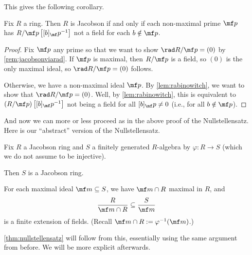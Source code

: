 This gives the following corollary.
\begin{corollary}[Rabinowitch] \label{cor:betterjacobson}
	Fix $R$ a ring. Then $R$ is Jacobson if and only if each non-maximal prime $\mf p$ has $R/\mf p\left[[b]_\mf p^{-1}\right]$ not a field for each $b\notin\mf p$.
\end{corollary}
\begin{proof}
	Fix $\mf p$ any prime so that we want to show $\rad R/\mf p=(0)$ by \autoref{rem:jacobsonviarad}. If $\mf p$ is maximal, then $R/\mf p$ is a field, so $(0)$ is the only maximal ideal, so $\rad R/\mf p=(0)$ follows.

	Otherwise, we have a non-maximal ideal $\mf p$. By \autoref{lem:rabinowitch}, we want to show that $\rad R/\mf p=(0)$. Well, by \autoref{lem:rabinowitch}, this is equivalent to $(R/\mf p)\left[[b]_\mf p^{-1}\right]$ not being a field for all $[b]_\mf p\ne0$ (i.e., for all $b\notin\mf p$).
\end{proof}
And now we can more or less proceed as in the above proof of the Nullstellensatz. Here is our ``abstract'' version of the Nullstellensatz.
\begin{theorem} \label{thm:gennullstellensatz}
	Fix $R$ a Jacobson ring and $S$ a finitely generated $R$-algebra by $\varphi:R\to S$ (which we do not assume to be injective).
	\begin{listalph}
		\item Then $S$ is a Jacobson ring.
		\item For each maximal ideal $\mf m\subseteq S$, we have $\mf m\cap R$ maximal in $R$, and
		\[\frac R{\mf m\cap R}\subseteq\frac S{\mf m}\]
		is a finite extension of fields. (Recall $\mf m\cap R:=\varphi^{-1}(\mf m)$.)
	\end{listalph}
\end{theorem}
\autoref{thm:nullstellensatz} will follow from this, essentially using the same argument from before. We will be more explicit afterwards.
